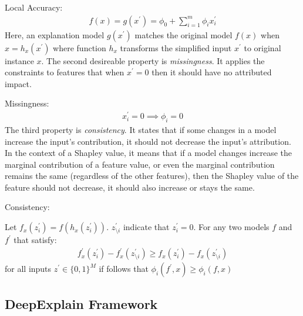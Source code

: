 \documentclass[english]{tktltiki2}
\theoremstyle{definition}
\theoremstyle{remark}
\begin{document}
\begin{properties} \label{prop:all_properties}
\item Local Accuracy:
\begin{align*}
	f(x) = g(x^\prime) =  \phi_0 + \sum_{i=1}^{m} \phi_i x_i^\prime 
\end{align*}
Here, an explanation model $g(x^\prime)$ matches the original model $f(x)$ when $x = h_x(x^\prime)$ where function $h_x$ transforms the simplified input $x^\prime$ to original instance $x$.
The second desireable property is \textit{missingness}. It applies the constraints to features that when $x^\prime = 0$ then it should have no attributed impact.
\item Missingness:
\begin{align*}
	x_i^\prime = 0 \implies \phi_i = 0
\end{align*}
The third property is \textit{consistency}. It states that if some changes in a model increase the input's contribution, it should not decrease the input's attribution. In the context of a Shapley value, it means that if a model changes increase the marginal contribution of a feature value, or even the marginal contribution remains the same (regardless of the other features), then the Shapley value of the feature should not decrease, it should also increase or stays the same.

\item Consistency: \par
Let $f_x(z_i^\prime) = f(h_x(z_i^\prime))$. $z^\prime_{\setminus i}$ indicate that $z^\prime_i = 0$. For any two models $f$ and $f^\prime$ that satisfy:
\begin{align*}
	f^\prime_x(z_i^\prime) - f^\prime_x(z^\prime_{\setminus i}) \geq f_x(z_i^\prime) - f_x(z^\prime_{\setminus i})
\end{align*}
for all inputs $z^\prime \in \{0,1\}^{M}$ if follows that $\phi_i(f^\prime, x) \geq \phi_i(f, x)$
\end{properties}

\subsection{DeepExplain Framework}\label{sec:DeepExplain}
\end{document}
